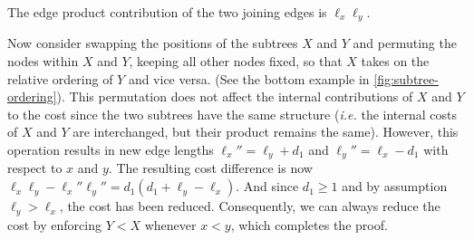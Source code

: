 \documentclass[10pt,conference,letterpaper]{IEEEtran}
\newcommand{\comment}[1]{}
\newcommand{\nodes}{nodes\xspace}
\newcommand{\ie}{{\it i.e.}\xspace}
\begin{document}
\begin{IEEEproof}
The edge product contribution
of the two joining edges is $\ell_x \ell_y$.  
\comment{
while keeping their internal orderings the same.  This results in new edge lengths
$\ell_x' = \ell_x + d_3$ and $\ell_y' = \ell_y - d_3$.  Thus the cost
difference due to the swap is
$\ell_x \ell_y - \ell_x' \ell_y' = d_3 (d_3 + \ell_x - \ell_y)$.
Since $d_3 \geq 1$, this difference is guaranteed positive if
$\ell_x \geq \ell_y$, resulting in a reduced total cost.
If on the other hand $\ell_x < \ell_y$, then we permute 
}
Now consider swapping
the positions of the subtrees $X$ and $Y$ and
permuting the \nodes
within $X$ and $Y$, keeping all other \nodes fixed, so that $X$
takes on the relative ordering of $Y$ and vice versa.  
(See the bottom example in \autoref{fig:subtree-ordering}).  
This
permutation does not affect the internal contributions of $X$
and $Y$ to the cost since the two subtrees have the same structure
(\ie the internal costs of $X$ and $Y$ are interchanged, but their
product remains the same).  However, this operation results in new
edge lengths $\ell_x'' = \ell_y + d_1$ and $\ell_y'' = \ell_x - d_1$
with respect to $x$ and $y$.  The resulting cost difference is
now $\ell_x \ell_y - \ell_x'' \ell_y'' = d_1 (d_1 + \ell_y - \ell_x)$.
And since $d_1 \geq 1$ and by assumption $\ell_y > \ell_x$, the
cost has been reduced.  Consequently, we can always reduce the
cost by enforcing $Y < X$ whenever $x < y$, which completes the
proof.
\end{IEEEproof}
\end{document}
